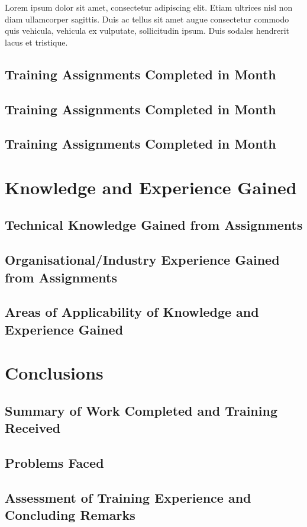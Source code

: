 \documentclass[a4paper, 12pt, fleqn]{report}
\begin{document}
\noindent Lorem ipsum dolor sit amet, consectetur adipiscing elit. Etiam ultrices nisl
non diam ullamcorper sagittis. Duis ac tellus sit amet augue consectetur commodo quis
vehicula, vehicula ex vulputate, sollicitudin ipsum. Duis sodales hendrerit lacus
et tristique.\newline

\section{Training Assignments Completed in  Month}

\section{Training Assignments Completed in  Month}

\section{Training Assignments Completed in  Month}


\chapter{Knowledge and Experience Gained}

\section{Technical Knowledge Gained from Assignments}

\section{Organisational/Industry Experience Gained from Assignments}

\section{Areas of Applicability of Knowledge and Experience Gained}


\chapter{Conclusions}

\section{Summary of Work Completed and Training Received}

\section{Problems Faced}

\section{Assessment of Training Experience and Concluding Remarks}
\end{document}
